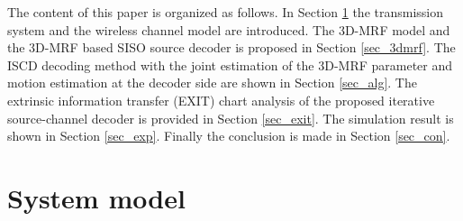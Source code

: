 \documentclass[10pt,twocolumn,twoside]{IEEEtran}
\begin{document}
The content of this paper is organized as follows. In Section \ref{sec_sm} the transmission system and the wireless channel model are introduced. The 3D-MRF model and the 3D-MRF based SISO source decoder is proposed in Section \ref{sec_3dmrf}. The ISCD decoding method with the joint estimation of the 3D-MRF parameter and motion estimation at the decoder side are shown in Section \ref{sec_alg}. The extrinsic information transfer (EXIT) chart analysis of the proposed iterative source-channel decoder is provided in Section \ref{sec_exit}.  The simulation result is shown in Section \ref{sec_exp}. Finally the conclusion is made in Section \ref{sec_con}.

\section{System model} \label{sec_sm}
\end{document}
